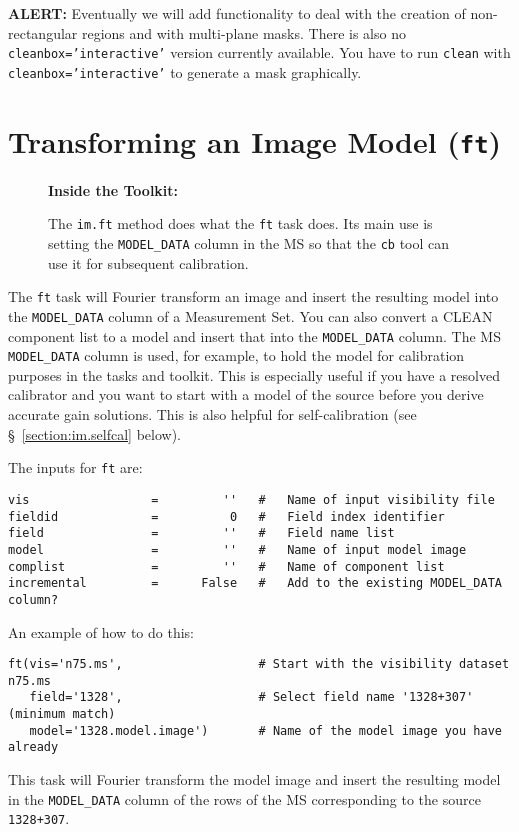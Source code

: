 {\bf ALERT:} Eventually we will add functionality to deal with the creation of
non-rectangular regions and with multi-plane masks.  There is also no
{\tt cleanbox='interactive'} version currently available.  You have to run
{\tt clean} with {\tt cleanbox='interactive'} to generate a mask graphically.

\section{Transforming an Image Model ({\tt ft})}
\label{section:im.ft}

\begin{wrapfigure}{r}{2.5in}
  \begin{boxedminipage}{2.5in}
     \centerline{\bf Inside the Toolkit:}
     The {\tt im.ft} method does what the {\tt ft} task does.
     Its main use is setting the {\tt MODEL\_DATA} column in the
     MS so that the {\tt cb} tool can use it for subsequent
     calibration.
  \end{boxedminipage}
\end{wrapfigure}

The {\tt ft} task will Fourier transform an image and insert the resulting model into the
{\tt MODEL\_DATA} column of a Measurement Set.
You can also convert a CLEAN component list to a model and insert that
into the {\tt MODEL\_DATA} column.  The MS {\tt MODEL\_DATA} column is
used, for example, to hold the model for calibration purposes in 
the tasks and toolkit.  This is especially useful if you have a resolved
calibrator and you want to start with a model of the source before you
derive accurate gain solutions.  This is also helpful for self-calibration
(see \S~\ref{section:im.selfcal} below).

The inputs for {\tt ft} are:
\small
\begin{verbatim}
vis                 =         ''   #   Name of input visibility file
fieldid             =          0   #   Field index identifier
field               =         ''   #   Field name list
model               =         ''   #   Name of input model image
complist            =         ''   #   Name of component list
incremental         =      False   #   Add to the existing MODEL_DATA column?
\end{verbatim}
\normalsize

An example of how to do this: 
\small
\begin{verbatim}
ft(vis='n75.ms',                   # Start with the visibility dataset n75.ms
   field='1328',                   # Select field name '1328+307' (minimum match) 
   model='1328.model.image')       # Name of the model image you have already
\end{verbatim}
\normalsize
This task will Fourier transform the model image and insert the
resulting model in the {\tt MODEL\_DATA} column of the rows of the MS 
corresponding to the source {\tt 1328+307}.

